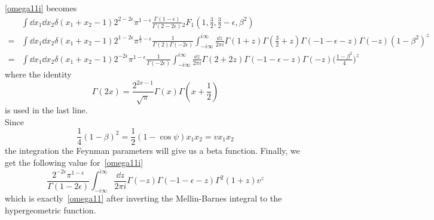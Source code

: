 \cref{omega11i} becomes
\begin{equation}
\begin{split}
& \int\dd x_1\dd x_2 
\delta(x_1+x_2-1) 
2^{2-2\epsilon} 
\pi^{1-\epsilon}\frac{\Gamma(1-\epsilon)}{\Gamma(2-2\epsilon)}
{}_2F_1(1,\frac{3}{2},\frac{3}{2}-\epsilon, \beta^2)
\\
= &
\int\dd x_1\dd x_2 \delta(x_1+x_2-1)
2^{1-2\epsilon}\pi^{\frac{1}{2}-\epsilon}\frac{1}{\Gamma(2)\Gamma(-2\epsilon)}\int^{i\infty}_{-i\infty}\frac{\dd z}{2\pi i}\Gamma(1+z)\Gamma(\frac{3}{2}+z)\Gamma(-1-\epsilon-z)\Gamma(-z)(1-\beta^2)^z
\\
=&
\int\dd x_1\dd x_2 \delta(x_1+x_2-1)
2^{-2\epsilon}\pi^{1-\epsilon}\frac{1}{\Gamma(-2\epsilon)}\int^{i\infty}_{-i\infty}\frac{\dd z}{2\pi i}\Gamma(2+2z)\Gamma(-1-\epsilon-z)\Gamma(-z)\big(\frac{1-\beta^2}{4}\big)^z
\end{split}
\end{equation}
where the identity
\begin{equation}
\Gamma(2x) = \frac{2^{2x-1}}{\sqrt{\pi}}\Gamma(x)\Gamma(x+\frac{1}{2})
\end{equation}
is used in the last line.
\\Since
\begin{equation}
\frac{1}{4}(1-\beta)^2 = \frac{1}{2}(1-\cos\psi)x_1x_2 = vx_1x_2 
\end{equation}
the integration \wrt the Feynman parameters will give us a beta function.
Finally, we get the following value for~\cref{omega11i}
\begin{equation}
\frac{2^{-2\epsilon}\pi^{1-\epsilon}}{\Gamma(1-2\epsilon)}\int^{i\infty}_{-i\infty}\frac{\dd z}{2\pi i}\Gamma(-z)\Gamma(-1-\epsilon -z)\Gamma^2(1+z) v^z
\end{equation}
which is exactly~\cref{omega11} after inverting the Mellin-Barnes integral to the hypergeometric function.